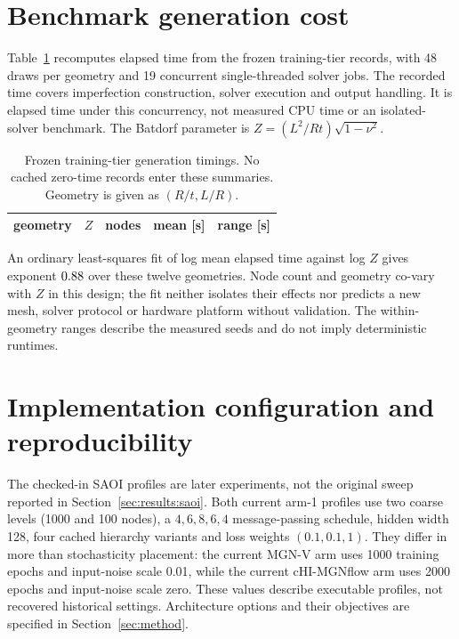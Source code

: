 \appendix
\section{Benchmark generation cost}
\label{app:cost}

Table~\ref{tab:cost} recomputes elapsed time from the frozen training-tier
records, with 48 draws per geometry and 19 concurrent single-threaded solver
jobs. The recorded time covers imperfection construction, solver execution and
output handling. It is elapsed time under this concurrency, not measured CPU
time or an isolated-solver benchmark. The Batdorf parameter is
$Z=(L^2/Rt)\sqrt{1-\nu^2}$.

\begin{table}[tbp]
\centering
\caption{Frozen training-tier generation timings. No cached zero-time records
enter these summaries. Geometry is given as $(R/t,L/R)$.}
\label{tab:cost}
\begin{tabular}{lrrrr}
\toprule
geometry & $Z$ & nodes & mean [s] & range [s] \\
\midrule

\bottomrule
\end{tabular}
\end{table}

An ordinary least-squares fit of log mean elapsed time against log $Z$ gives
exponent $0.88$ over these twelve geometries. Node count and geometry
co-vary with $Z$ in this design; the fit neither isolates their effects nor
predicts a new mesh, solver protocol or hardware platform without validation.
The within-geometry ranges describe the measured seeds and do not imply
deterministic runtimes.

\section{Implementation configuration and reproducibility}
\label{app:config}

The checked-in SAOI profiles are later experiments, not the original sweep
reported in Section~\ref{sec:results:saoi}. Both current arm-1 profiles use two
coarse levels (1000 and 100 nodes), a $4,6,8,6,4$ message-passing schedule,
hidden width 128, four cached hierarchy variants and loss weights
$(0.1,0.1,1)$. They differ in more than stochasticity placement: the current
MGN-V arm uses 1000 training epochs and input-noise scale 0.01, while the
current cHI-MGNflow arm uses 2000 epochs and input-noise scale zero.
These values describe executable profiles, not recovered historical settings.
Architecture options and their objectives are specified in
Section~\ref{sec:method}.

